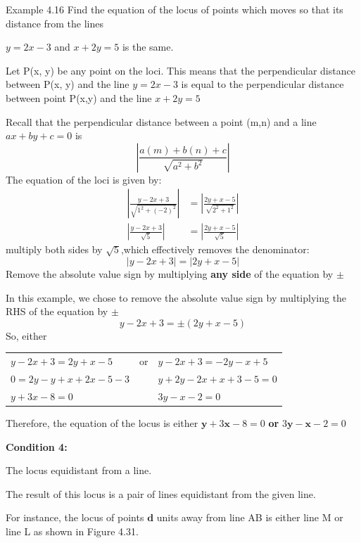 \begin{example}{Example 4.16}
Find the equation of the locus of points which moves so that its distance from the
lines

$y = 2x - 3$ and $x + 2y = 5$ is the same.

Let P(x, y) be any point on the loci. This means that the perpendicular distance
between P(x, y) and the line $y = 2x - 3$ is equal to the perpendicular distance
between point P(x,y) and the line $x + 2y = 5$

Recall that the perpendicular distance between a point (m,n) and a line $ax + by
+ c = 0$ is
\[ \left|\frac{a(m) + b(n) + c}{\sqrt{a^2 + b^2}}\right| \]
The equation of the loci is given by:
\begin{align*}
\left|\frac{y - 2x + 3}{\sqrt{1^2 + (-2)^2}}\right| &= \left|\frac{2y + x - 5}{\sqrt{2^2 + 1^2}}\right| \\
\left|\frac{y - 2x + 3}{\sqrt{5}}\right| &= \left|\frac{2y + x - 5}{\sqrt{5}}\right|
\end{align*}
multiply both sides by $\sqrt{5}$,which effectively removes the denominator:
\[ |y - 2x + 3| = |2y + x - 5| \]
Remove the absolute value sign by multiplying \textbf{any side} of the equation by $\pm$

In this example, we chose to remove the absolute value sign by multiplying the
RHS of the equation by $\pm$
\[ y - 2x + 3 = \pm(2y + x - 5) \]
So, either
\begin{center}
\begin{tabular}{@{}l@{\qquad}c@{\qquad}l@{}}
$y - 2x + 3 = 2y + x - 5$ & or & $y - 2x + 3 = -2y - x + 5$ \\
$0 = 2y - y + x + 2x - 5 - 3$ & & $y + 2y - 2x + x + 3 - 5 = 0$ \\
$y + 3x - 8 = 0$ & & $3y - x - 2 = 0$
\end{tabular}
\end{center}
Therefore, the equation of the locus is either $\boldsymbol{y} + 3\boldsymbol{x} - 8 = 0$ \textbf{or} $3\boldsymbol{y} - \boldsymbol{x} - 2 = 0$
\end{example}

\textbf{Condition 4:}

The locus equidistant from a line.

The result of this locus is a pair of lines equidistant from the given line.

For instance, the locus of points $\boldsymbol{d}$ units away from line AB is either line M or line
L as shown in Figure 4.31.
\begin{center}
\end{center}


